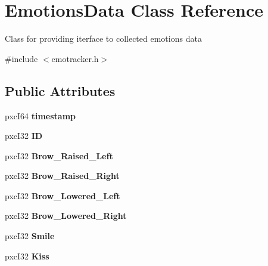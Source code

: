 \hypertarget{class_emotions_data}{}\section{Emotions\+Data Class Reference}
\label{class_emotions_data}


Class for providing iterface to collected emotions data  




{\ttfamily \#include $<$emotracker.\+h$>$}

\subsection*{Public Attributes}
\begin{DoxyCompactItemize}
\item 
\mbox{\label{class_emotions_data_a2dd2e5d4d571bbef0f8a37f979f58a20}} 
pxc\+I64 {\bfseries timestamp}
\item 
\mbox{\label{class_emotions_data_a80715df3a36d71e73f6cec07bf5b2cad}} 
pxc\+I32 {\bfseries ID}
\item 
\mbox{\label{class_emotions_data_a1ec4fee770d1e2481034756a780a8988}} 
pxc\+I32 {\bfseries Brow\+\_\+\+Raised\+\_\+\+Left}
\item 
\mbox{\label{class_emotions_data_ae746d58ab5dd6cf74d25b50ef35dce53}} 
pxc\+I32 {\bfseries Brow\+\_\+\+Raised\+\_\+\+Right}
\item 
\mbox{\label{class_emotions_data_ac74e5139b07c7cba057d9964f20ab926}} 
pxc\+I32 {\bfseries Brow\+\_\+\+Lowered\+\_\+\+Left}
\item 
\mbox{\label{class_emotions_data_a58bbf1608041a436bab4ce11ea44d1cf}} 
pxc\+I32 {\bfseries Brow\+\_\+\+Lowered\+\_\+\+Right}
\item 
\mbox{\label{class_emotions_data_a0decd2d2474ba17b3c7c7ca4c45a8575}} 
pxc\+I32 {\bfseries Smile}
\item 
\mbox{\label{class_emotions_data_ab436efd316dba8097ae1456cb6418605}} 
pxc\+I32 {\bfseries Kiss}

\end{DoxyCompactItemize}
